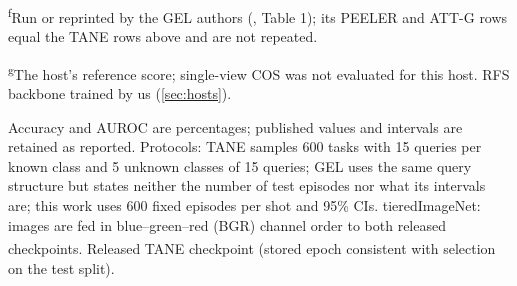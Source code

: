 \begin{table}[tbp]
\begin{minipage}{\linewidth}
\textsuperscript{f}Run or reprinted by the GEL authors (\cite{wang2023gel}, Table 1); its PEELER and ATT-G rows equal the TANE rows above and are not repeated.\par
\textsuperscript{g}The host's reference score; single-view COS was not evaluated for this host. RFS backbone trained by us (\cref{sec:hosts}).\par
Accuracy and AUROC are percentages; published values and intervals are retained as reported. Protocols: TANE samples 600 tasks with 15 queries per known class and 5 unknown classes of 15 queries; GEL uses the same query structure but states neither the number of test episodes nor what its intervals are; this work uses 600 fixed episodes per shot and 95\% CIs. tieredImageNet: images are fed in blue--green--red (BGR) channel order to both released checkpoints. \textsuperscript{\dag}Released TANE checkpoint (stored epoch consistent with selection on the test split).\par
\end{minipage}
\end{table}
